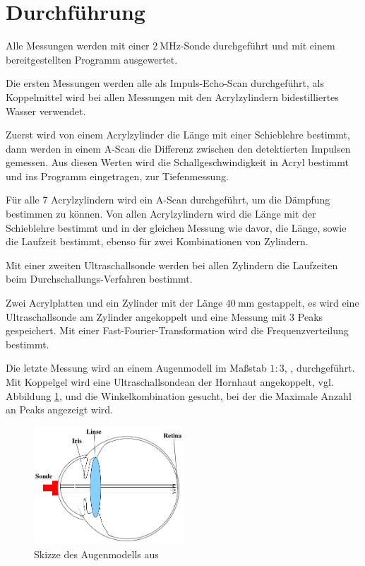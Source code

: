 \section{Durchführung}
\label{sec:durchfuehrung}
Alle Messungen werden mit einer $\SI{2}{\mega\hertz}$-Sonde durchgeführt
und mit einem bereitgestellten Programm ausgewertet.

Die ersten Messungen werden alle als Impuls-Echo-Scan durchgeführt,
als Koppelmittel wird bei allen Messungen mit den Acrylzylindern bidestilliertes
Wasser verwendet.

Zuerst wird von einem Acrylzylinder die Länge mit einer Schieblehre bestimmt,
dann werden in
einem A-Scan die Differenz zwischen den detektierten Impulsen gemessen.
Aus diesen Werten wird die Schallgeschwindigkeit in Acryl bestimmt und ins
Programm eingetragen, zur Tiefenmessung.

Für alle 7 Acrylzylindern wird ein A-Scan durchgeführt, um die Dämpfung bestimmen
zu können.
Von allen Acrylzylindern wird die Länge mit der Schieblehre bestimmt
und in der gleichen Messung wie davor, die Länge, sowie die Laufzeit bestimmt,
ebenso für zwei Kombinationen von Zylindern.

Mit einer zweiten Ultraschallsonde werden bei allen Zylindern die Laufzeiten
beim Durchschallungs-Verfahren bestimmt.

Zwei Acrylplatten und ein Zylinder mit der Länge $\SI{40}{\milli\meter}$
gestappelt, es wird eine Ultraschallsonde am Zylinder angekoppelt und eine
Messung mit 3 Peaks gespeichert.
Mit einer Fast-Fourier-Transformation wird die Frequenzverteilung bestimmt.

Die letzte Messung wird an einem Augenmodell im Maßstab $1\!:\!3$, \cite{Anleitung},
durchgeführt. Mit Koppelgel wird eine Ultraschallsondean der Hornhaut angekoppelt,
vgl. Abbildung \ref{fig:augenmodell},
und die Winkelkombination gesucht, bei der die Maximale Anzahl an Peaks angezeigt wird.

\begin{figure}
    \centering
    \includegraphics[width=0.5\textwidth]{content/augenmodell.png}
    \caption{Skizze des Augenmodells aus \cite{Anleitung}}
    \label{fig:augenmodell}
\end{figure}
